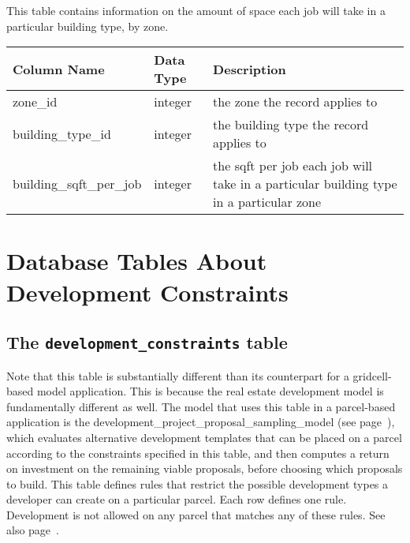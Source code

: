 This table contains information on the amount of space each job will take in a particular building type, by zone.

\begin{tabular}{p{2.3in}lp{3.2in}}
\textbf{Column Name} & \textbf{Data Type} & \textbf{Description} \\
\hline
zone\_id & integer & the zone the record applies to\\ \hline
building\_type\_id & integer & the building type the record applies to\\ \hline
building\_sqft\_per\_job & integer & the sqft per job each job will take in a particular building type in a particular zone \\ \hline
\end{tabular}

\section{Database Tables About Development Constraints}

\subsection{The {\tt development_constraints} table}
%
Note that this table is substantially different than its counterpart for a gridcell-based
model application.  This is because the real estate development model is fundamentally
different as well.  The model that uses this table in a parcel-based application is the 
development\_project\_proposal\_sampling\_model (see page~\pageref{sec:model-system-development-project-proposal-sampling-model}), 
which evaluates alternative 
development templates that can be placed on a parcel according to the constraints
specified in this table, and then computes a return on investment on the remaining
viable proposals, before choosing which proposals to build.
This table defines rules that restrict the possible development types a
developer can create on a particular parcel.  Each row defines one rule.
Development is not allowed on any parcel that matches any of these rules. See also page~\pageref{sec-development-constraints}.

